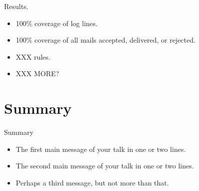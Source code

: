 \documentclass{beamer}
\begin{document}
\begin{frame}{Results.}

    \begin{itemize}

        \item 100\% coverage of log lines.

        \item 100\% coverage of all mails accepted, delivered, or rejected.

        \item XXX rules.

        \item XXX MORE\@?

    \end{itemize}

\end{frame}



\section*{Summary}

\begin{frame}{Summary}

    \begin{itemize}

        \item The \alert{first main message} of your talk in one or two lines.

        \item The \alert{second main message} of your talk in one or two lines.

        \item Perhaps a \alert{third message}, but not more than that.

    \end{itemize}

\end{frame}
\end{document}
